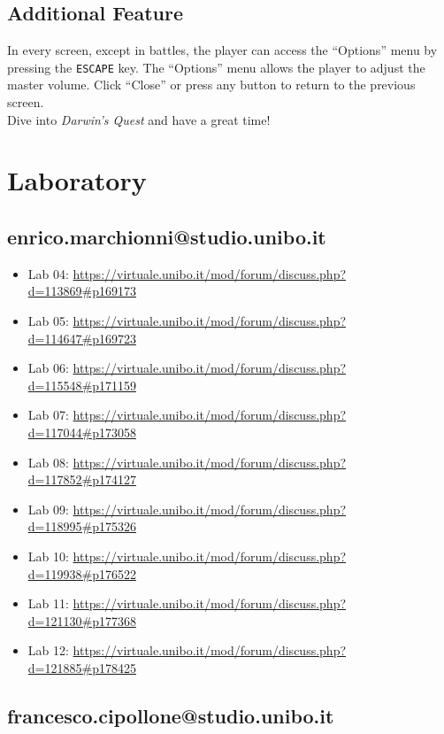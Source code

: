 \documentclass[12pt, a4paper]{report}
\theoremstyle{definition}
\begin{document}
\section{Additional Feature}
In every screen, except in battles, the player can access the ``Options'' menu by pressing the \verb|ESCAPE| key.
The ``Options'' menu allows the player to adjust the master volume. Click ``Close'' or press any button to return to the previous screen.\\
Dive into \emph{Darwin's Quest} and have a great time!


\chapter{Laboratory}

\section{enrico.marchionni@studio.unibo.it}

\begin{itemize}
    \item Lab 04: \url{https://virtuale.unibo.it/mod/forum/discuss.php?d=113869#p169173}
    \item Lab 05: \url{https://virtuale.unibo.it/mod/forum/discuss.php?d=114647#p169723}
    \item Lab 06: \url{https://virtuale.unibo.it/mod/forum/discuss.php?d=115548#p171159}
    \item Lab 07: \url{https://virtuale.unibo.it/mod/forum/discuss.php?d=117044#p173058}
    \item Lab 08: \url{https://virtuale.unibo.it/mod/forum/discuss.php?d=117852#p174127}
    \item Lab 09: \url{https://virtuale.unibo.it/mod/forum/discuss.php?d=118995#p175326}
    \item Lab 10: \url{https://virtuale.unibo.it/mod/forum/discuss.php?d=119938#p176522}
    \item Lab 11: \url{https://virtuale.unibo.it/mod/forum/discuss.php?d=121130#p177368}
    \item Lab 12: \url{https://virtuale.unibo.it/mod/forum/discuss.php?d=121885#p178425}
\end{itemize}

\section{francesco.cipollone@studio.unibo.it}
\end{document}
